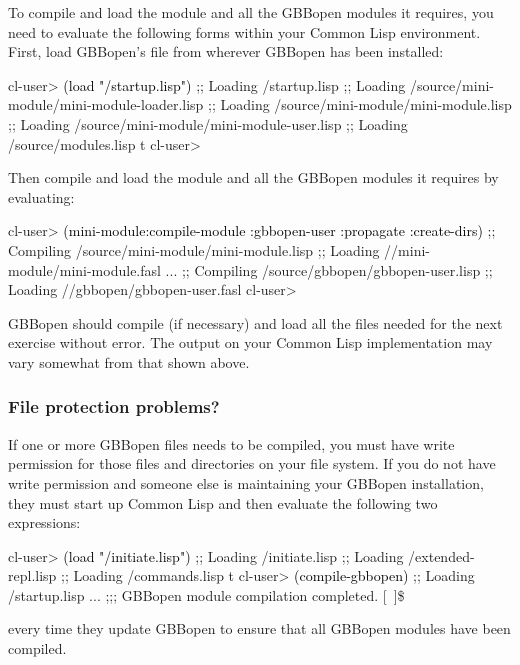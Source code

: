 \documentclass[10pt,twoside,english,pdftex]{article}
\begin{document}
To compile and load the  module and all the GBBopen
modules it requires, you need to evaluate the following forms within your
Common Lisp environment.  First, load GBBopen's
 file from wherever GBBopen has been
installed:
%
\W\supp
\begin{example}
\textcolor{darkergray}{%
  cl-user> \textcolor{black}{(load "/startup.lisp")}
  ;; Loading /startup.lisp
  ;;  Loading /source/mini-module/mini-module-loader.lisp
  ;;   Loading /source/mini-module/mini-module.lisp
  ;;     Loading /source/mini-module/mini-module-user.lisp
  ;;  Loading /source/modules.lisp
  t
  cl-user>}
\end{example}
%
%
Then compile and load the  module and all the
GBBopen modules it requires by evaluating:
%
\W\supp\notpretop
\begin{example}
\textcolor{darkergray}{%
  cl-user> \textcolor{black}{(mini-module:compile-module :gbbopen-user :propagate :create-dirs)}
  ;; Compiling /source/mini-module/mini-module.lisp
  ;; Loading //mini-module/mini-module.fasl
       ...
  ;; Compiling /source/gbbopen/gbbopen-user.lisp
  ;; Loading //gbbopen/gbbopen-user.fasl
  cl-user>}
\end{example}

GBBopen should compile (if necessary) and load all the files needed for the
next exercise without error.  The output on your Common Lisp implementation
may vary somewhat from that shown above.

\subsubsection*{File protection problems?}

%
If one or more GBBopen files needs to be compiled, you must have write
permission for those files and directories on your file system.  If you do not
have write permission and someone else is maintaining your GBBopen
installation, they must start up Common Lisp and then evaluate the following
two expressions:
%
\W\supp
\begin{example}
\textcolor{darkergray}{%
  cl-user> \textcolor{black}{(load "/initiate.lisp")}
  ;; Loading /initiate.lisp
  ;;  Loading /extended-repl.lisp
  ;;  Loading /commands.lisp
  t
  cl-user> \textcolor{black}{(compile-gbbopen)}
  ;; Loading /startup.lisp
     ...
  ;;; GBBopen module compilation completed.
  [~]\$}
\end{example}
%
every time they update GBBopen to ensure that all GBBopen modules have
been compiled.
\end{document}
